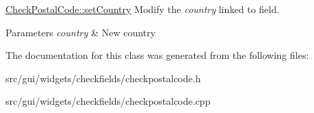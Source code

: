 \hyperlink{classCheckPostalCode_ac82e538c932bd9165d3d40ea949baa4b}{Check\+Postal\+Code\+::set\+Country} Modify the {\itshape country} linked to field. 


\begin{DoxyParams}{Parameters}
{\em country} & New country \\
\hline
\end{DoxyParams}


The documentation for this class was generated from the following files\+:\begin{DoxyCompactItemize}
\item 
src/gui/widgets/checkfields/checkpostalcode.\+h\item 
src/gui/widgets/checkfields/checkpostalcode.\+cpp\end{DoxyCompactItemize}
